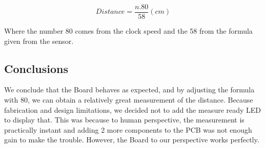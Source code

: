 \[
Distance=\frac{n.80}{58}(cm)
\]

Where the number 80 comes from the clock speed and the 58 from the
formula given from the sensor.

\subsection{Conclusions}

We conclude that the Board behaves as expected, and by adjusting the
formula with 80, we can obtain a relatively great measurement of the
distance. Because fabrication and design limitations, we decided not
to add the measure ready LED to display that. This was because to
human perspective, the measurement is practically instant and adding
2 more components to the PCB was not enough gain to make the trouble.
However, the Board to our perspective works perfectly.
